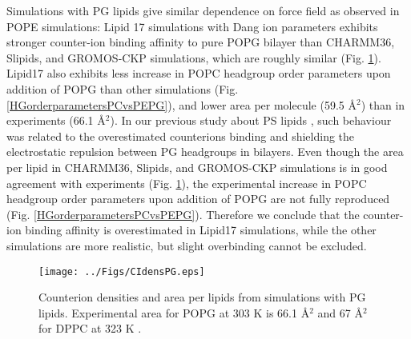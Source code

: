 \documentclass[journal=jpcbfk]{achemso}
\begin{document}
Simulations with PG lipids give similar dependence on force field as observed in POPE simulations:
Lipid 17 simulations with Dang ion parameters exhibits stronger counter-ion binding affinity to pure POPG bilayer
than CHARMM36, Slipids, and GROMOS-CKP simulations, which are roughly similar (Fig. \ref{CIdensPG}).
Lipid17 also exhibits less increase in POPC headgroup
order parameters upon addition of POPG than other simulations (Fig. \ref{HGorderparametersPCvsPEPG}),
and lower area per molecule (59.5 {\AA}$^2$) than in experiments (66.1 {\AA}$^2$).
In our previous study about PS lipids \cite{antila18}, such behaviour was related to 
the overestimated counterions binding and shielding the electrostatic repulsion between PG headgroups
in bilayers.%
%
Even though the area per lipid in CHARMM36, Slipids, and GROMOS-CKP simulations is in good agreement
with experiments (Fig. \ref{CIdensPG}), the experimental increase in 
POPC headgroup order parameters upon addition of POPG are not fully reproduced (Fig. \ref{HGorderparametersPCvsPEPG}).
Therefore we conclude that the counter-ion binding affinity is overestimated in Lipid17 simulations,
while the other simulations are more realistic, but slight overbinding cannot be excluded.
\begin{figure}[]
  \centering
  \texttt{[image: ../Figs/CIdensPG.eps]}
  \caption{\label{CIdensPG}
    Counterion densities and area per lipids from simulations with PG lipids.
    Experimental area for POPG at 303 K is 66.1 {\AA}$^2$ and 67 {\AA}$^2$ for DPPC at 323 K \cite{pan12b}.
  }
\end{figure}
\end{document}
